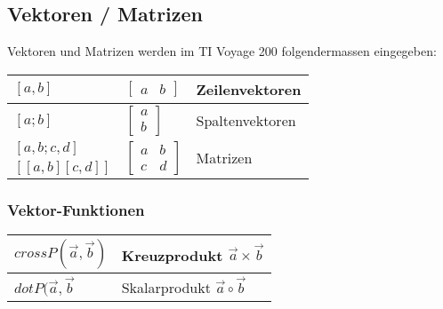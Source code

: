 \subsection{Vektoren / Matrizen}

Vektoren und Matrizen werden im TI Voyage 200 folgendermassen eingegeben: \\
\begin{tabular}{|l|l|l|}
	\hline
	$ [a,b] $ 			& $ \begin{bmatrix} a & b \end{bmatrix} $ 								& Zeilenvektoren \\ \hline
	$ [a;b] $			& $ \begin{bmatrix} a \\ b \end{bmatrix} $								& Spaltenvektoren \\ \hline
	$ [a,b;c,d] $		& \multirow{2}{*}{ $ \begin{bmatrix}a & b \\ c & d  \end{bmatrix} $ }	& \multirow{2}{*}{Matrizen}\\
	$ [[a,b][c,d]] $	&	& \\ \hline
\end{tabular}

\subsubsection{Vektor-Funktionen}
\begin{tabular}{|l|l|}
	\hline
	$crossP( \vec{a}, \vec{b})$		& Kreuzprodukt $\vec{a} \times \vec{b}$ \\ \hline
	$dotP( \vec{a}, \vec{b}$		& Skalarprodukt $\vec{a} \circ \vec{b}$ \\ \hline
\end{tabular}

